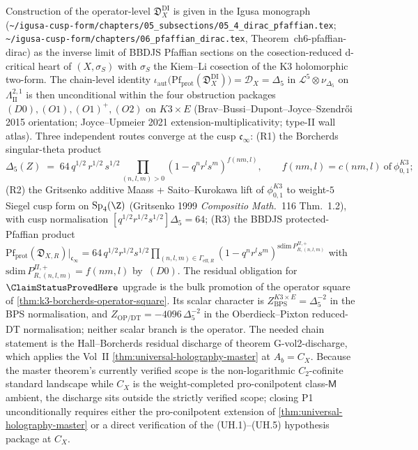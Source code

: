 \begin{remark}
Construction of the operator-level $\mathfrak{D}_X^{\mathrm{DI}}$ is
given in the Igusa monograph
(\texttt{\textasciitilde/igusa-cusp-form/chapters/05\_subsections/05\_4\_dirac\_pfaffian.tex};
\texttt{\textasciitilde/igusa-cusp-form/chapters/06\_pfaffian\_dirac.tex},
Theorem~ch6-pfaffian-dirac) as the inverse limit of BBDJS Pfaffian
sections on the cosection-reduced d-critical heart of
$(X, \sigma_S)$ with $\sigma_S$ the Kiem--Li cosection of the K3
holomorphic two-form. The chain-level identity
$\iota_{\mathrm{aut}}\bigl(\mathrm{Pf}_{\mathrm{prot}}(\mathfrak{D}_X^{\mathrm{DI}})\bigr)
= \mathcal{D}_X = \Delta_5$
in $\mathcal{L}^5 \otimes \nu_{\Delta_5}$ on $\Lambda^{2,1}_{\mathrm{II}}$
is then unconditional within the four obstruction packages
$(D0), (O1), (O1)^+, (O2)$ on $K3 \times E$
(Brav--Bussi--Dupont--Joyce--Szendrői 2015 orientation; Joyce--Upmeier
2021 extension-multiplicativity; type-II wall atlas). Three independent
routes converge at the cusp $\mathfrak{c}_\infty$:
(R1) the Borcherds singular-theta product
\[
 \Delta_5(Z)
 \;=\;
 64\, q^{1/2}\, r^{1/2}\, s^{1/2}
 \prod_{(n, l, m) > 0}
 (1 - q^n r^l s^m)^{f(nm, l)},
\qquad
 f(nm, l) = c(nm, l)\ \text{of}\ \phi_{0,1}^{K3};
\]
(R2) the Gritsenko additive Maass + Saito--Kurokawa lift of
$\phi_{0,1}^{K3}$ to weight-$5$ Siegel cusp form on
$\mathrm{Sp}_4(\Z)$ (Gritsenko 1999 \emph{Compositio Math.}~116
Thm.~1.2), with cusp normalisation
$[q^{1/2} r^{1/2} s^{1/2}] \Delta_5 = 64$; (R3) the BBDJS
protected-Pfaffian product
$\mathrm{Pf}_{\mathrm{prot}}(\mathfrak{D}_{X, R})|_{\mathfrak{c}_\infty}
= 64\, q^{1/2} r^{1/2} s^{1/2}
\prod_{(n, l, m) \in \Gamma_{\mathrm{eff}, R}}
(1 - q^n r^l s^m)^{\mathrm{sdim}\, P^{\Pi,+}_{R, (n, l, m)}}$
with $\mathrm{sdim}\, P^{\Pi,+}_{R, (n, l, m)} = f(nm, l)$ by~$(D0)$.
The residual obligation for $\ClaimStatusProvedHere$ upgrade is the
bulk promotion of the operator square of
\cref{thm:k3-borcherds-operator-square}.  Its scalar character is
\(Z_{\mathrm{BPS}}^{K3 \times E}=\Delta_5^{-2}\) in the BPS
normalisation, and
\(Z_{\mathrm{OP/DT}}=-4096\,\Delta_5^{-2}\) in the
Oberdieck--Pixton reduced-DT normalisation; neither scalar branch is
the operator.  The needed chain statement is the Hall--Borcherds
residual discharge of theorem G-vol2-discharge, which applies the Vol~II
\cref{thm:universal-holography-master} at $A_b = C_X$. Because the
master theorem's currently verified scope is the non-logarithmic
$C_2$-cofinite standard landscape while $C_X$ is the weight-completed
pro-conilpotent class-$\mathsf{M}$ ambient, the discharge sits outside
the strictly verified scope; closing P1 unconditionally requires
either the pro-conilpotent extension of
\cref{thm:universal-holography-master} or a direct verification of
the (UH.1)--(UH.5) hypothesis package at $C_X$.


\end{remark}

